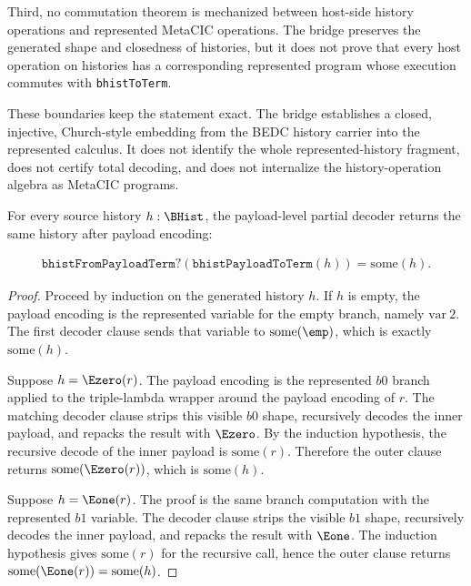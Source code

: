 Third, no commutation theorem is mechanized between host-side history
operations and represented MetaCIC operations. The bridge preserves the
generated shape and closedness of histories, but it does not prove that every
host operation on histories has a corresponding represented program whose
execution commutes with \texttt{bhistToTerm}.

These boundaries keep the statement exact. The bridge establishes a closed,
injective, Church-style embedding from the BEDC history carrier into the
represented calculus. It does not identify the whole represented-history
fragment, does not certify total decoding, and does not internalize the
history-operation algebra as MetaCIC programs.

\begin{lemma}
\label{lem:bhist-payload-partial-decoder-left-inverse}
For every source history $h:\BHist$, the payload-level partial decoder returns the same history after payload encoding:

$$
\begin{aligned}
\texttt{bhistFromPayloadTerm?}(\texttt{bhistPayloadToTerm}(h))
  = \mathrm{some}(h).
\end{aligned}
$$
\end{lemma}
\begin{proof}
Proceed by induction on the generated history $h$. If $h$ is empty, the payload encoding is the represented variable for the empty branch, namely $\mathrm{var}\ 2$. The first decoder clause sends that variable to $\mathrm{some}(\emp)$, which is exactly $\mathrm{some}(h)$.

Suppose $h=\Ezero(r)$. The payload encoding is the represented $b0$ branch applied to the triple-lambda wrapper around the payload encoding of $r$. The matching decoder clause strips this visible $b0$ shape, recursively decodes the inner payload, and repacks the result with $\Ezero$. By the induction hypothesis, the recursive decode of the inner payload is $\mathrm{some}(r)$. Therefore the outer clause returns $\mathrm{some}(\Ezero(r))$, which is $\mathrm{some}(h)$.

Suppose $h=\Eone(r)$. The proof is the same branch computation with the represented $b1$ variable. The decoder clause strips the visible $b1$ shape, recursively decodes the inner payload, and repacks the result with $\Eone$. The induction hypothesis gives $\mathrm{some}(r)$ for the recursive call, hence the outer clause returns $\mathrm{some}(\Eone(r))=\mathrm{some}(h)$.
\end{proof}

